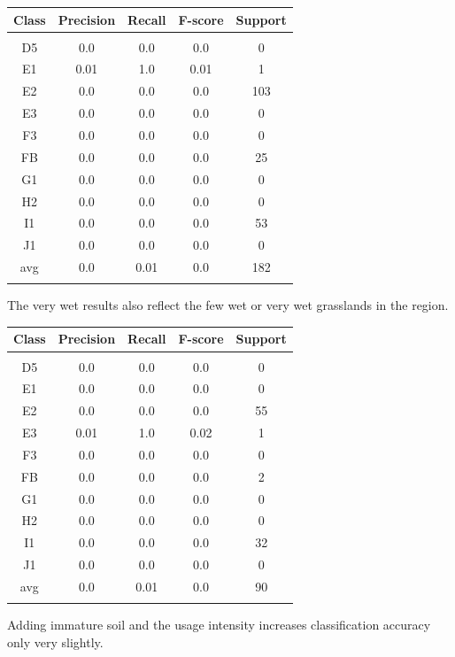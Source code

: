 \documentclass[authoryear, review,12pt,number]{elsarticle}
\begin{document}
\begin{tabular}{c c c c c}
Class & Precision & Recall & F-score & Support\\
\hline\\
D5 & 0.0 & 0.0 & 0.0 & 0\\
E1 & 0.01 & 1.0 & 0.01 & 1\\
E2 & 0.0 & 0.0 & 0.0 & 103\\
E3 & 0.0 & 0.0 & 0.0 & 0\\
F3 & 0.0 & 0.0 & 0.0 & 0\\
FB & 0.0 & 0.0 & 0.0 & 25\\
G1 & 0.0 & 0.0 & 0.0 & 0\\
H2 & 0.0 & 0.0 & 0.0 & 0\\
I1 & 0.0 & 0.0 & 0.0 & 53\\
J1 & 0.0 & 0.0 & 0.0 & 0\\
avg & 0.0 & 0.01 & 0.0 & 182\\
\label{fig_dry_classification}
\end{tabular}
The very wet results also reflect the few wet or very wet grasslands in the 
region.
\begin{tabular}{c c c c c}
Class & Precision & Recall & F-score & Support\\
\hline\\
D5 & 0.0 & 0.0 & 0.0 & 0\\
E1 & 0.0 & 0.0 & 0.0 & 0\\
E2 & 0.0 & 0.0 & 0.0 & 55\\
E3 & 0.01 & 1.0 & 0.02 & 1\\
F3 & 0.0 & 0.0 & 0.0 & 0\\
FB & 0.0 & 0.0 & 0.0 & 2\\
G1 & 0.0 & 0.0 & 0.0 & 0\\
H2 & 0.0 & 0.0 & 0.0 & 0\\
I1 & 0.0 & 0.0 & 0.0 & 32\\
J1 & 0.0 & 0.0 & 0.0 & 0\\
avg & 0.0 & 0.01 & 0.0 & 90\\
\label{fig_very_wet_classification}
\end{tabular}

Adding immature soil and the usage intensity increases classification accuracy 
only very slightly.
\end{document}
